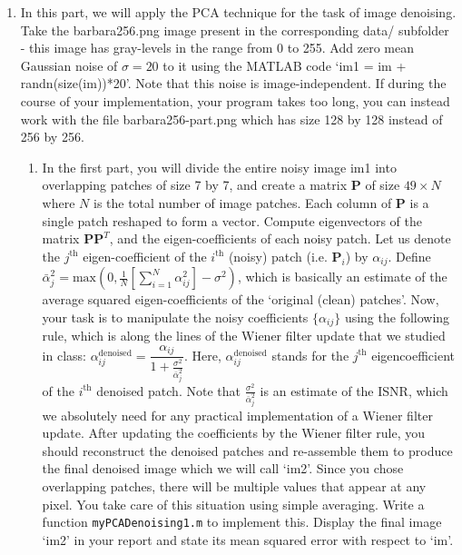 \documentclass[11pt]{article}
\begin{document}
\begin{enumerate}
\item In this part, we will apply the PCA technique for the task of image denoising. Take the barbara256.png image present in the corresponding data/ subfolder - this image has gray-levels in the range from 0 to 255. Add zero mean Gaussian noise of $\sigma = 20$ to it using the MATLAB code `im1 = im + randn(size(im))*20'. Note that this noise is image-independent. If during the course of your implementation, your program takes too long, you can instead work with the file barbara256-part.png which has size 128 by 128 instead of 256 by 256. 
\begin{enumerate}
\item In the first part, you will divide the entire noisy image im1 into overlapping patches of size 7 by 7, and create a matrix $\mathbf{P}$ of size $49 \times N$ where $N$ is the total number of image patches. Each column of $\mathbf{P}$ is a single patch reshaped to form a vector. Compute eigenvectors of the matrix $\mathbf{PP}^T$, and the eigen-coefficients of each noisy patch. 
Let us denote the $j^{\textrm{th}}$ eigen-coefficient of the $i^{\textrm{th}}$ (noisy) patch (i.e. $\mathbf{P}_i$) by $\alpha_{ij}$. Define $\bar{\alpha}^2_j = \textrm{max}(0,\frac{1}{N}[\sum_{i=1}^N \alpha^2_{ij}] - \sigma^2)$, which is basically an estimate of the average squared eigen-coefficients of the `original (clean) patches'. Now, your task is to manipulate the noisy coefficients $\{\alpha_{ij}\}$ using the following rule, which is along the lines of the Wiener filter update that we studied in class:
$\alpha^{\textrm{denoised}}_{ij} = \dfrac{\alpha_{ij}}{1 + \frac{\sigma^2}{\bar{\alpha}^2_j}}$.
Here, $\alpha^{\textrm{denoised}}_{ij}$ stands for the $j^{\textrm{th}}$ eigencoefficient of the $i^{\textrm{th}}$ denoised patch. Note that $\frac{\sigma^2}{\bar{\alpha}^2_j}$ is an estimate of the ISNR, which we absolutely need for any practical implementation of a Wiener filter update.  After updating the coefficients by the Wiener filter rule, you should reconstruct the denoised patches and re-assemble them to produce the final denoised image which we will call `im2'. Since you chose overlapping patches, there will be multiple values that appear at any pixel. You take care of this situation using simple averaging. Write a function \texttt{myPCADenoising1.m} to implement this. Display the final image `im2' in your report and state its mean squared error with respect to `im'. 

\end{enumerate}
\end{enumerate}
\end{document}
